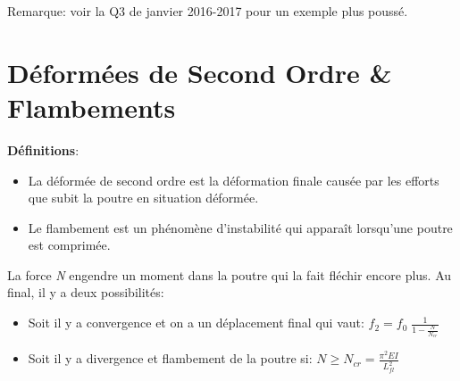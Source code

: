\documentclass[a4paper]{article}
\begin{document}
Remarque: voir la Q3 de janvier 2016-2017 pour un exemple plus poussé.










\section{Déformées de Second Ordre \& Flambements}





\textbf{Définitions}:
\begin{itemize}

    \item La déformée de second ordre est la déformation finale causée par les efforts que subit la poutre en situation déformée.
    \item Le flambement est un phénomène d’instabilité qui apparaît lorsqu’une poutre est comprimée.

\end{itemize}






La force \emph{N} engendre un moment dans la poutre qui la fait fléchir encore plus. Au final, il y a deux possibilités:
\begin{itemize}

    \item Soit il y a convergence et on a un déplacement final qui vaut: $\displaystyle f_2 = f_0 \; \frac{1}{1 - \frac{N}{N_{cr}} } $
    \item Soit il y a divergence et flambement de la poutre si: $\displaystyle N \geq N_{cr} = \frac{\pi^2 E I}{L^2_{fl}} $

\end{itemize}
\end{document}
